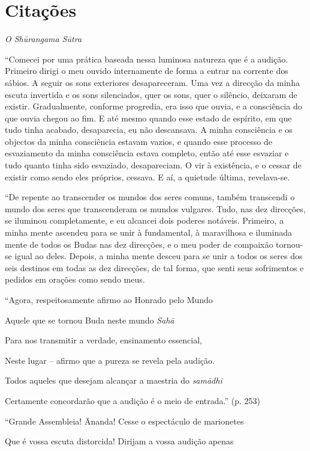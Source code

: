 \chapter{Citações}

\emph{O Shūrangama Sūtra}

``Comecei por uma prática baseada nessa luminosa natureza que é a
audição. Primeiro dirigi o meu ouvido internamente de forma a entrar na
corrente dos sábios. A seguir os sons exteriores desapareceram. Uma vez
a direcção da minha escuta invertida e os sons silenciados, quer os
sons, quer o silêncio, deixaram de existir. Gradualmente, conforme
progredia, era isso que ouvia, e a consciência do que ouvia chegou ao
fim. E até mesmo quando esse estado de espírito, em que tudo tinha
acabado, desaparecia, eu não descansava. A minha consciência e os
objectos da minha consciência estavam vazios, e quando esse processo de
esvaziamento da minha consciência estava completo, então até esse
esvaziar e tudo quanto tinha sido esvaziado, desapareciam. O vir à
existência, e o cessar de existir como sendo eles próprios, cessava. E
aí, a quietude última, revelava-se.

``De repente ao transcender os mundos dos seres comuns, também
transcendi o mundo dos seres que transcenderam os mundos vulgares. Tudo,
nas dez direcções, se iluminou completamente, e eu alcancei dois poderes
notáveis. Primeiro, a minha mente ascendeu para se unir à fundamental, à
maravilhosa e iluminada mente de todos os Budas nas dez direcções, e o
meu poder de compaixão tornou-se igual ao deles. Depois, a minha mente
desceu para se unir a todos os seres dos seis destinos em todas as dez
direcções, de tal forma, que senti seus sofrimentos e pedidos em orações
como sendo meus.

``Agora, respeitosamente afirmo ao Honrado pelo Mundo

Aquele que se tornou Buda neste mundo \emph{Sahā}

Para nos transmitir a verdade, ensinamento essencial,

Neste lugar -- afirmo que a pureza se revela pela audição.

Todos aqueles que desejam alcançar a maestria do \emph{samādhi}

Certamente concordarão que a audição é o meio de entrada.'' (p. 253)

``Grande Assembleia! Ānanda! Cesse o espectáculo de marionetes

Que é vossa escuta distorcida! Dirijam a vossa audição apenas

